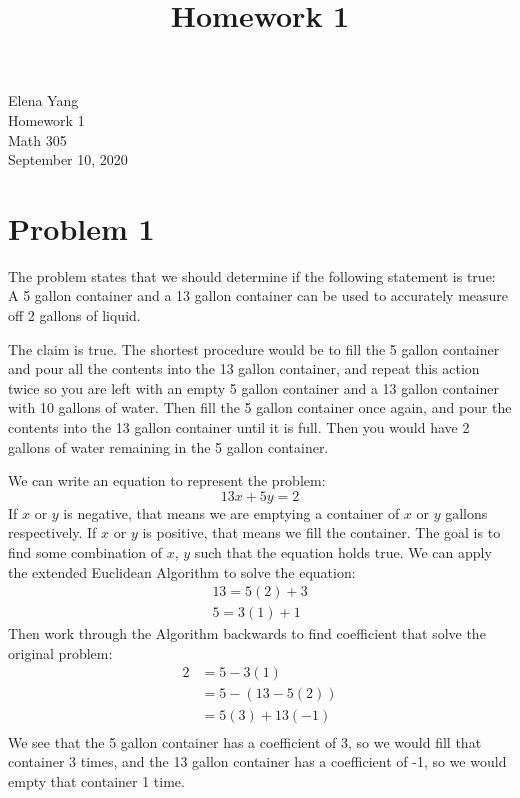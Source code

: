 \documentclass[12pt]{article}
\title{Homework 1}
\begin{document}
Elena Yang \\
Homework 1 \\
Math 305 \\
September 10, 2020

\hrulefill

\section{Problem 1}
The problem states that we should determine if the following statement is true: \\
A 5 gallon container and a 13 gallon container can be used to accurately measure off 2 gallons of liquid.

The claim is true. The shortest procedure would be to fill the 5 gallon container and pour all the contents into the 13 gallon container, and repeat this action twice so you are left with an empty 5 gallon container and a 13 gallon container with 10 gallons of water. Then fill the 5 gallon container once again, and pour the contents into the 13 gallon container until it is full. Then you would have 2 gallons of water remaining in the 5 gallon container.

We can write an equation to represent the problem:
\begin{equation*}
    13x + 5y = 2
\end{equation*}
If $x$ or $y$ is negative, that means we are emptying a container of $x$ or $y$ gallons respectively. If $x$ or $y$ is positive, that means we fill the container.
The goal is to find some combination of $x$, $y$ such that the equation holds true. 
We can apply the extended Euclidean Algorithm to solve the equation:
\begin{align*}
    \label{Forwards} 
    13 = 5(2) + 3\\
    5 = 3(1) + 1
\end{align*}
Then work through the Algorithm backwards to find coefficient that solve the original problem:
\begin{equation*}
\begin{split}
2 & =  5 - 3(1)\\
 & =  5 - (13 - 5(2))\\
 & = 5(3) + 13(-1)\\
\end{split}
\end{equation*}
We see that the 5 gallon container has a coefficient of 3, so we would fill that container 3 times, and the 13 gallon container has a coefficient of -1, so we would empty that container 1 time.
\end{document}
